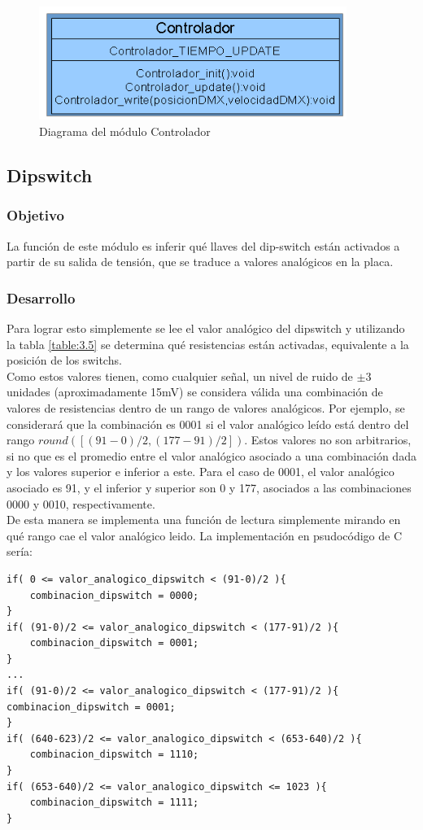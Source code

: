 \begin{figure}[!ht]
	\centering
	\includegraphics[width=10cm,scale=1]{resources/3_27-moduloControlador.png}
	\caption{Diagrama del módulo Controlador}
	\label{fig:\thefigure}
\end{figure}

\subsection{Dipswitch}
\subsubsection{Objetivo}
La función de este módulo es inferir qué llaves del dip-switch están activados a partir de su salida de tensión, que se traduce a valores analógicos en la placa. 

\subsubsection{Desarrollo}
Para lograr esto simplemente se lee el valor analógico del dipswitch y utilizando la tabla \ref{table:3.5} se determina qué resistencias están activadas, equivalente a la posición de los switchs. \\
Como estos valores tienen, como cualquier señal, un nivel de ruido de \(\pm\)3 unidades (aproximadamente 15mV) se considera válida una combinación de valores de resistencias dentro de un rango de valores analógicos. Por ejemplo, se considerará que la combinación es 0001 si el valor analógico leído está dentro del rango \(round([(91-0)/2,(177-91)/2])\). Estos valores no son arbitrarios, si no que es el promedio entre el valor analógico asociado a una combinación dada y los valores superior e inferior a este. Para el caso de 0001, el valor analógico asociado es 91, y el inferior y superior son 0 y 177, asociados a las combinaciones 0000 y 0010, respectivamente.\\
De esta manera se implementa una función de lectura simplemente mirando en qué rango cae el valor analógico leido. La implementación en psudocódigo de C sería:
\begin{lstlisting}[style=CStyle]
if( 0 <= valor_analogico_dipswitch < (91-0)/2 ){
	combinacion_dipswitch = 0000;
}
if( (91-0)/2 <= valor_analogico_dipswitch < (177-91)/2 ){
	combinacion_dipswitch = 0001;
}
...
if( (91-0)/2 <= valor_analogico_dipswitch < (177-91)/2 ){
combinacion_dipswitch = 0001;
}
if( (640-623)/2 <= valor_analogico_dipswitch < (653-640)/2 ){
	combinacion_dipswitch = 1110;
}
if( (653-640)/2 <= valor_analogico_dipswitch <= 1023 ){
	combinacion_dipswitch = 1111;
}
\end{lstlisting}

